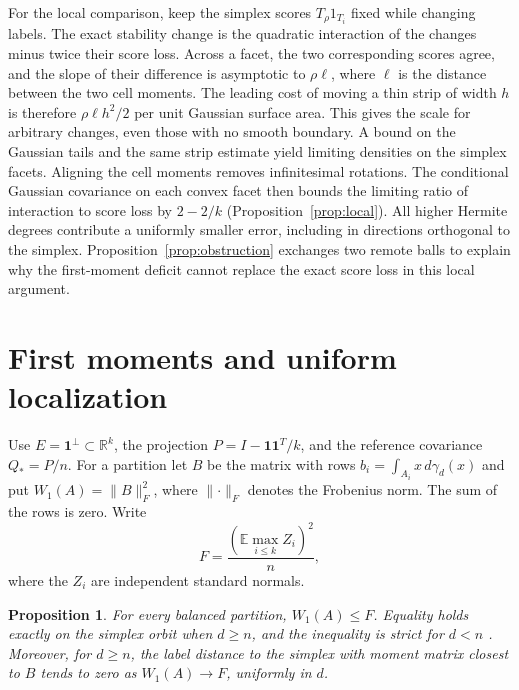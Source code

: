 \documentclass[11pt,reqno]{amsart}
\newtheorem{proposition}[theorem]{Proposition}
\newcommand{\R}{\mathbb R}
\newcommand{\E}{\mathbb E}
\newcommand{\one}{\mathbf 1}
\newcommand{\norm}[1]{\lVert #1\rVert}
\newcommand{\ga}{\gamma}
\begin{document}
For the local comparison, keep the simplex scores $T_\rho1_{T_i}$
fixed while changing labels. The exact stability change is the quadratic
interaction of the changes minus twice their score loss. Across a facet,
the two corresponding scores agree, and the slope of their difference
is asymptotic to $\rho\ell$, where $\ell$ is the distance between the two
cell moments. The leading cost of moving a thin strip of width $h$ is
therefore $\rho\ell h^2/2$ per unit Gaussian surface area. This gives the scale for
arbitrary changes, even those with no smooth boundary. A bound on the
Gaussian tails and the same strip estimate yield limiting densities on
the simplex facets. Aligning the cell moments removes infinitesimal
rotations. The conditional Gaussian covariance on each convex facet
then bounds the limiting ratio of interaction to score loss by
$2-2/k$ (Proposition~\ref{prop:local}). All higher Hermite degrees
contribute a uniformly smaller error, including in directions
orthogonal to the simplex. Proposition~\ref{prop:obstruction} exchanges
two remote balls to explain why the first-moment deficit cannot replace
the exact score loss in this local argument.

\section{First moments and uniform localization}\label{sec:alignment}

Use $E=\one^\perp\subset\R^k$, the projection $P=I-\one\one^T/k$,
and the reference covariance $Q_*=P/n$. For a partition let $B$ be the
matrix with rows $b_i=\int_{A_i}x\,d\ga_d(x)$ and put
$W_1(A)=\norm B_F^2$, where $\norm{\cdot}_F$ denotes the Frobenius norm.
The sum of the rows is zero. Write
\[
 F=\frac{(\E\max_{i\le k}Z_i)^2}{n},
\]
where the $Z_i$ are independent standard normals.

\begin{proposition}\label{prop:zhang}
For every balanced partition, $W_1(A)\le F$. Equality holds exactly on
the simplex orbit when $d\ge n$, and the inequality is strict for $d<n$
\cite[Theorem~1]{Zhang}. Moreover, for $d\ge n$, the label distance to
the simplex with moment matrix closest to $B$ tends to zero as
$W_1(A)\to F$, uniformly in $d$.
\end{proposition}
\end{document}
